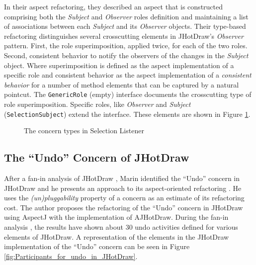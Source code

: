 In their aspect refactoring, they described an aspect that is constructed comprising both the \textit{Subject} and \textit{Observer} roles definition and maintaining a list of associations between each \textit{Subject} and its \textit{Observer} objects.
Their type-based refactoring\cite{marin2005approach} distinguishes several crosscutting elements in JHotDraw's \textit{Observer} pattern. 
First, the role superimposition, applied twice, for each of the two roles. 
Second, consistent behavior to notify the observers of the changes in the \textit{Subject} object.
Where superimposition is defined as the aspect implementation of a specific role and consistent behavior as the aspect implementation of a \textit{consistent behavior} for a number of method elements that can be captured by a natural pointcut.
The \texttt{GenericRole} (empty) interface documents the crosscutting type of role superimposition. 
Specific roles, like \textit{Observer} and \textit{Subject} (\texttt{SelectionSubject}) extend the interface.
These elements are shown in Figure \ref{fig:Concerns_Selection_Listener}.

\begin{figure}[H]
	\centering
  	\caption{The concern types in Selection Listener \cite{marin2005approach}}
  	\label{fig:Concerns_Selection_Listener}
\end{figure}

\subsection{The ``Undo'' Concern of JHotDraw}\label{The Undo Concern of JHotDraw}
After a fan-in analysis of JHotDraw \cite{marin2004identifying}, Marin identified the  ``Undo'' concern in JHotDraw and he presents an approach to its aspect-oriented refactoring \cite{marin2004refactoring}. 
He uses the \textit{(un)pluggability} property of a concern as an estimate of its refactoring cost. 
The author proposes the refactoring of the ``Undo'' concern in JHotDraw using AspectJ with the implementation of AJHotDraw. 
During the fan-in analysis \cite{marin2004identifying}, the results have shown about 30 undo activities defined for various elements of JHotDraw. 
A representation of the elements in the JHotDraw implementation of the ``Undo'' concern can be seen in Figure \ref{fig:Participants_for_undo_in_JHotDraw}.

